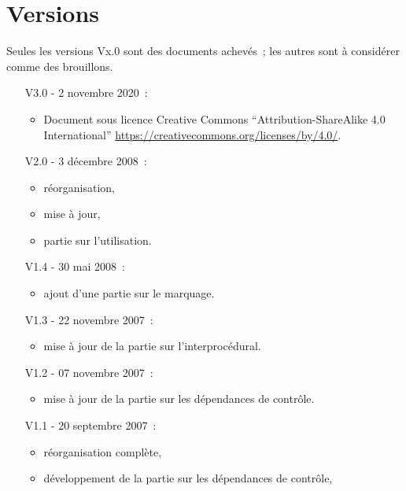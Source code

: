 \section*{Versions}

\begin{small}

Seules les versions Vx.0 sont des documents achevés~;
les autres sont à considérer comme des brouillons.

\begin{enumerate}
  \item[V3.0 -] 2 novembre 2020~:
    \begin{itemize}
    \item Document sous licence Creative Commons
      ``Attribution-ShareAlike 4.0 International''
      \url{https://creativecommons.org/licenses/by/4.0/}.
    \end{itemize}
  \item[V2.0 -] 3 décembre 2008~:
    \begin{itemize}
      \item réorganisation,
      \item mise à jour,
      \item partie sur l'utilisation.
    \end{itemize}
  \item[V1.4 - ] 30 mai 2008~:
    \begin{itemize}
      \item ajout d'une partie sur le marquage.
    \end{itemize}
  \item[V1.3 - ] 22 novembre 2007~:
    \begin{itemize}
      \item mise à jour de la partie sur l'interprocédural.
    \end{itemize}
  \item[V1.2 - ] 07 novembre 2007~:
    \begin{itemize}
      \item mise à jour de la partie sur les dépendances de contrôle.
    \end{itemize}
  \item[V1.1 - ] 20 septembre 2007~:
    \begin{itemize}
      \item réorganisation complète,
      \item développement de la partie sur les dépendances de contrôle,

\end{itemize}
\end{enumerate}
\end{small}
